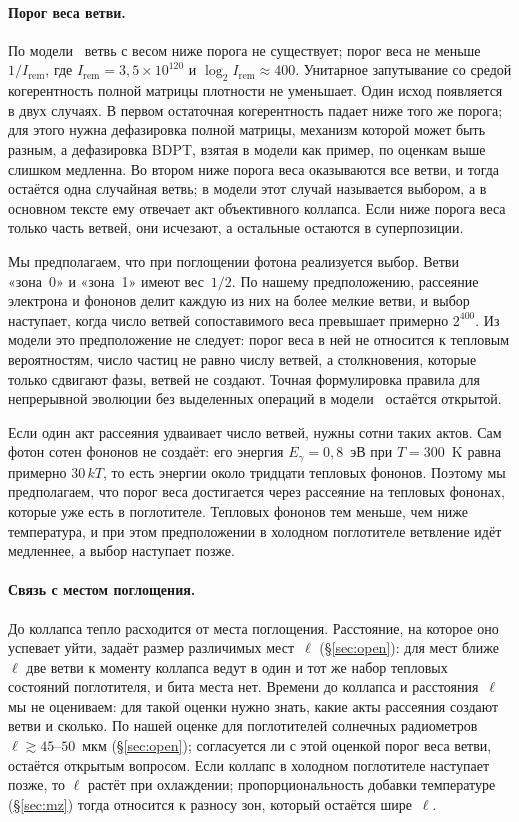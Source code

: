 \documentclass[11pt,a4paper]{article}
\newcommand{\Sref}[1]{\hyperref[#1]{\S\ref{#1}}}
\begin{document}
\paragraph{Порог веса ветви.}
По модели~\cite{ponfilenok2026threshold} ветвь с весом ниже порога не существует; порог веса не меньше $1/I_{\mathrm{rem}}$, где $I_{\mathrm{rem}}=3{,}5\times10^{120}$ и $\log_2 I_{\mathrm{rem}}\approx400$. Унитарное запутывание со средой когерентность полной матрицы плотности не уменьшает. Один исход появляется в двух случаях. В первом остаточная когерентность падает ниже того же порога; для этого нужна дефазировка полной матрицы, механизм которой может быть разным, а дефазировка BDPT, взятая в модели как пример, по оценкам выше слишком медленна. Во втором ниже порога веса оказываются все ветви, и тогда остаётся одна случайная ветвь; в модели этот случай называется выбором, а в основном тексте ему отвечает акт объективного коллапса. Если ниже порога веса только часть ветвей, они исчезают, а остальные остаются в суперпозиции.

Мы предполагаем, что при поглощении фотона реализуется выбор. Ветви «зона~0» и «зона~1» имеют вес~$1/2$. По нашему предположению, рассеяние электрона и фононов делит каждую из них на более мелкие ветви, и выбор наступает, когда число ветвей сопоставимого веса превышает примерно $2^{400}$. Из модели это предположение не следует: порог веса в ней не относится к тепловым вероятностям, число частиц не равно числу ветвей, а столкновения, которые только сдвигают фазы, ветвей не создают. Точная формулировка правила для непрерывной эволюции без выделенных операций в модели~\cite{ponfilenok2026threshold} остаётся открытой.

Если один акт рассеяния удваивает число ветвей, нужны сотни таких актов. Сам фотон сотен фононов не создаёт: его энергия $E_\gamma=0{,}8$~эВ при $T=300$~K равна примерно $30\,kT$, то есть энергии около тридцати тепловых фононов. Поэтому мы предполагаем, что порог веса достигается через рассеяние на тепловых фононах, которые уже есть в поглотителе. Тепловых фононов тем меньше, чем ниже температура, и при этом предположении в холодном поглотителе ветвление идёт медленнее, а выбор наступает позже.

\paragraph{Связь с местом поглощения.}
До коллапса тепло расходится от места поглощения. Расстояние, на которое оно успевает уйти, задаёт размер различимых мест~$\ell$ (\Sref{sec:open}): для мест ближе~$\ell$ две ветви к моменту коллапса ведут в один и тот же набор тепловых состояний поглотителя, и бита места нет. Времени до коллапса и расстояния~$\ell$ мы не оцениваем: для такой оценки нужно знать, какие акты рассеяния создают ветви и сколько. По нашей оценке для поглотителей солнечных радиометров $\ell\gtrsim 45$--$50$~мкм (\Sref{sec:open}); согласуется ли с этой оценкой порог веса ветви, остаётся открытым вопросом. Если коллапс в холодном поглотителе наступает позже, то $\ell$ растёт при охлаждении; пропорциональность добавки температуре (\Sref{sec:mz}) тогда относится к разносу зон, который остаётся шире~$\ell$.
\end{document}
